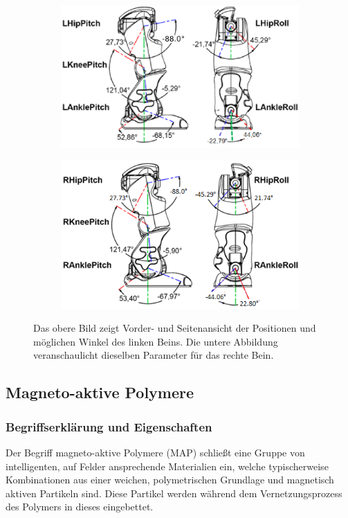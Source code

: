 \begin{figure}[tb]
	\hfill
	\begin{subfigure}[c]{\linewidth}
		\centering
		\includegraphics[width=0.7\linewidth]{Bilder/hardware_llegjoint.png}
	\end{subfigure}
	\begin{subfigure}[c]{\linewidth}
		\centering
		\includegraphics[width=0.7\linewidth]{Bilder/hardware_rlegjoint.png}
	\end{subfigure}
	\hfill
	\caption{Das obere Bild zeigt Vorder- und Seitenansicht der Positionen und möglichen Winkel des linken Beins. Die untere Abbildung veranschaulicht dieselben Parameter für das rechte Bein. \cite[in /kinematics-data/joints]{nao_docu_dev_guide}}
	\label{hardware_legjoint}
\end{figure}


\FloatBarrier
\subsection{Magneto-aktive Polymere}\label{kap_MAP}
\subsubsection*{Begriffserklärung und Eigenschaften}
Der Begriff magneto-aktive Polymere (MAP) schließt eine Gruppe von intelligenten, auf Felder ansprechende Materialien ein, welche typischerweise Kombinationen aus einer weichen, polymetrischen Grundlage und magnetisch aktiven Partikeln sind. Diese Partikel werden während dem Vernetzungsprozess des Polymers in dieses eingebettet. 

